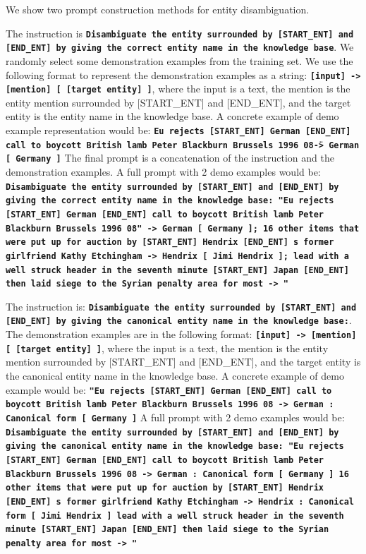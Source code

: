 We show two prompt construction methods for entity disambiguation.

The instruction  is \textbf{\texttt{Disambiguate the entity surrounded by [START\_ENT] and [END\_ENT] by giving the correct entity name in the knowledge base}}.
%
We randomly select some demonstration examples from the training set.
We use the following format to represent the demonstration examples as a string:
\textbf{\texttt{[input] -> [mention] [ [target entity] ]}}, where the input is a text, the mention is the entity mention surrounded by [START\_ENT] and [END\_ENT], and the target entity is the entity name in the knowledge base.
%
A concrete example of demo example representation would be:
\textbf{\texttt{Eu rejects [START\_ENT] German [END\_ENT] call to boycott British lamb Peter Blackburn Brussels 1996 08\" -> German [ Germany ]}}
%
The final prompt is a concatenation of the instruction and the demonstration examples.
A full prompt with 2 demo examples would be: \\
\textbf{\texttt{Disambiguate the entity surrounded by [START\_ENT] and [END\_ENT] by giving the correct entity name in the knowledge base: "Eu rejects [START\_ENT] German [END\_ENT] call to boycott British lamb Peter Blackburn Brussels 1996 08" -> German [ Germany ]; 16 other items that were put up for auction by [START\_ENT] Hendrix [END\_ENT] s former girlfriend Kathy Etchingham -> Hendrix [ Jimi Hendrix ]; lead with a well struck header in the seventh minute [START\_ENT] Japan [END\_ENT] then laid siege to the Syrian penalty area for most -> "}}

The instruction is:
\textbf{\texttt{Disambiguate the entity surrounded by [START\_ENT] and [END\_ENT] by giving the canonical entity name in the knowledge base:}}.
%
The demonstration examples are in the following format:
\textbf{\texttt{[input] -> [mention] [ [target entity] ]}}, where the input is a text, the mention is the entity mention surrounded by [START\_ENT] and [END\_ENT], and the target entity is the canonical entity name in the knowledge base.
%
A concrete example of demo example would be:
\textbf{\texttt{"Eu rejects [START\_ENT] German [END\_ENT] call to boycott British lamb Peter Blackburn Brussels 1996 08 -> German : Canonical form [ Germany ]}}
%
A full prompt with 2 demo examples would be:
\textbf{\texttt{Disambiguate the entity surrounded by [START\_ENT] and [END\_ENT] by giving the canonical entity name in the knowledge base: "Eu rejects [START\_ENT] German [END\_ENT] call to boycott British lamb Peter Blackburn Brussels 1996 08 -> German : Canonical form [ Germany ] 16 other items that were put up for auction by [START\_ENT] Hendrix [END\_ENT] s former girlfriend Kathy Etchingham -> Hendrix : Canonical form [ Jimi Hendrix ] lead with a well struck header in the seventh minute [START\_ENT] Japan [END\_ENT] then laid siege to the Syrian penalty area for most -> "}}


